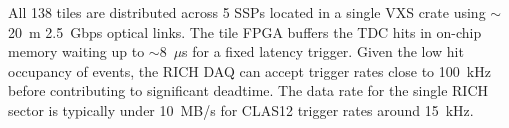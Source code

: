 All 138 tiles are distributed across 5 SSPs located in a single VXS crate using $\sim$20~m 2.5~Gbps optical links. The
tile FPGA buffers the TDC hits in on-chip memory waiting up to $\sim$8~$\mu$s for a fixed latency trigger. Given the
low hit occupancy of events, the RICH DAQ can accept trigger rates close to 100~kHz before contributing to significant
deadtime. The data rate for the single RICH sector is typically under 10~MB/s for CLAS12 trigger rates around 15~kHz.


